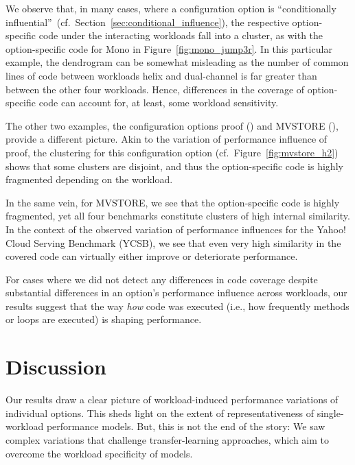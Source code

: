 {{{We  observe that, in many cases, where  a configuration option is ``conditionally influential''~(cf.~Section~\ref{sec:conditional_influence}), the respective option-specific code under the interacting workloads fall into a cluster, as with the option-specific code for \textsf{Mono} in Figure~\ref{fig:mono_jump3r}. In this particular example, the dendrogram can be somewhat misleading as the number of common lines of code between workloads helix and dual-channel is far greater than between the other four workloads. Hence, differences in the coverage of option-specific code can account for, at least, some workload sensitivity.

The other two examples, the configuration options \textsf{proof} (\zdrei) and \textsf{MVSTORE} (\htwo), provide a different picture. Akin to the variation of performance influence of \textsf{proof}, the clustering for this configuration option (cf.~Figure~\ref{fig:mvstore_h2}) shows that some clusters are disjoint, and thus the option-specific code is highly fragmented depending on the workload. 

In the same vein, for \textsf{MVSTORE}, we see that the option-specific code is highly fragmented, yet all four benchmarks constitute clusters of high internal similarity. In the context of the observed variation of performance influences for the Yahoo! Cloud Serving Benchmark (YCSB), we see that even very high similarity in the covered code can virtually either improve or deteriorate performance.

For cases where we did not detect any differences in code coverage despite substantial differences in an option's performance influence across workloads, our results suggest that the way \emph{how} code was executed (i.e., how frequently methods or loops are executed) is shaping performance.

\color{black}
\section{Discussion}\label{sec:discussion}
Our results draw a clear picture of workload-induced performance variations of individual options. This sheds light on the extent of representativeness of single-workload performance models. But, this is not the end of the story: We saw complex variations that challenge transfer-learning approaches, which aim to overcome the workload specificity of models.


}}}
